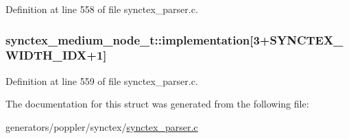 Definition at line 558 of file synctex\+\_\+parser.\+c.

\hypertarget{structsynctex__medium__node__t_a9860ddefe84048ba9dbefa320b90444f}{
\subsubsection[{implementation}]{ synctex\+\_\+medium\+\_\+node\+\_\+t\+::implementation\mbox{[}3+{\bf S\+Y\+N\+C\+T\+E\+X\+\_\+\+W\+I\+D\+T\+H\+\_\+\+I\+D\+X}+1\mbox{]}}}\label{structsynctex__medium__node__t_a9860ddefe84048ba9dbefa320b90444f}


Definition at line 559 of file synctex\+\_\+parser.\+c.



The documentation for this struct was generated from the following file\+:\begin{DoxyCompactItemize}
\item 
generators/poppler/synctex/\hyperlink{synctex__parser_8c}{synctex\+\_\+parser.\+c}\end{DoxyCompactItemize}
